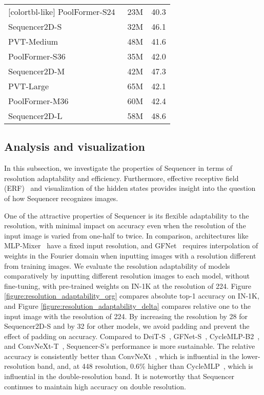 \documentclass{article}
\begin{document}
\begin{table}[tb]
\begin{minipage}[t]{0.35\textwidth}
\begin{NiceTabular}{lcc}[colortbl-like]
PoolFormer-S24~\cite{yu2021metaformer}& 23M& 40.3 \\
Sequencer2D-S & 32M & 46.1 \\ \hline
PVT-Medium~\cite{wang2021pyramid}& 48M& 41.6 \\
PoolFormer-S36\cite{yu2021metaformer}& 35M& 42.0 \\
Sequencer2D-M & 42M & 47.3 \\ \hline
PVT-Large~\cite{wang2021pyramid}& 65M& 42.1 \\
PoolFormer-M36~\cite{yu2021metaformer}& 60M& 42.4 \\
Sequencer2D-L & 58M & 48.6 \\ \hline
\end{NiceTabular}
\label{table:segmentation}
\end{minipage}
\end{table}

\subsection{Analysis and visualization}
\label{subsec:analysis_visualization}
In this subsection, we investigate the properties of Sequencer in terms of resolution adaptability and efficiency. Furthermore, effective receptive field (ERF)~\cite{luo2016understanding} and visualization of the hidden states provides insight into the question of how Sequencer recognizes images.

One of the attractive properties of Sequencer is its flexible adaptability to the resolution, with minimal impact on accuracy even when the resolution of the input image is varied from one-half to twice. In comparison, architectures like MLP-Mixer~\cite{tolstikhin2021mlp} have a fixed input resolution, and GFNet~\cite{rao2021global} requires interpolation of weights in the Fourier domain when inputting images with a resolution different from training images. We evaluate the resolution adaptability of models comparatively by inputting different resolution images to each model, without fine-tuning, with pre-trained weights on IN-1K at the resolution of 224. Figure \ref{figure:resolution_adaptability_org} compares absolute top-1 accuracy on IN-1K, and Figure \ref{figure:resolution_adaptability_delta} compares relative one to the input image with the resolution of 224. By increasing the resolution by 28 for Sequencer2D-S and by 32 for other models, we avoid padding and prevent the effect of padding on accuracy. Compared to DeiT-S~\cite{touvron2020training}, GFNet-S~\cite{rao2021global}, CycleMLP-B2~\cite{chen2022cyclemlp}, and ConvNeXt-T~\cite{liu2022convnet}, Sequencer-S's performance is more sustainable. The relative accuracy is consistently better than ConvNeXt~\cite{liu2022convnet}, which is influential in the lower-resolution band, and, at 448 resolution, 0.6\% higher than CycleMLP~\cite{chen2022cyclemlp}, which is influential in the double-resolution band. It is noteworthy that Sequencer continues to maintain high accuracy on double resolution.
\end{document}
